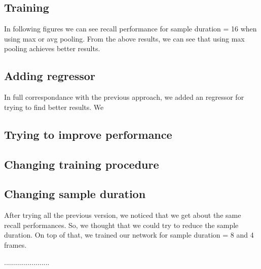 \documentclass{report}
\begin{document}
\subsection{Training}
In following figures we can see recall performance for sample duration = 16 when using max or avg pooling. 
From the above results, we can see that using max pooling achieves better results.

\subsection{Adding regressor}
In full correspondance with the previous approach, we added an regressor for trying to find better results. We 

\subsection{Trying to  improve performance}

\subsection{Changing training procedure}

\subsection{Changing sample duration}
After trying all the previous version, we noticed that we get about the same recall performances. So, we thought that we could try
to reduce the sample duration. On top of that, we trained our network for sample duration = 8 and 4 frames. %

.......................
\end{document}
